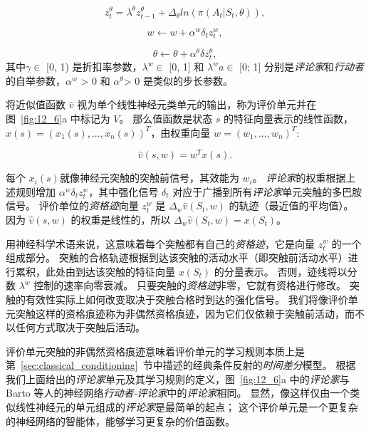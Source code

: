 \begin{equation}
	z_t^{\theta} = \lambda^{\theta} z_{t-1}^{\theta}
		+ \Delta_{\theta} ln(\pi(A_t | S_t, \theta)),
\end{equation}


\begin{equation}
	w \longleftarrow w + \alpha^w \delta_t z_t^w,
\end{equation}

\begin{equation}
	\theta \longleftarrow \theta + \alpha^{\theta} \delta z_t^{\theta},
\end{equation}
其中$\gamma \in $ [0, 1) 是折扣率参数，$\lambda^w \in$ [0, 1] 和 $\lambda ^w a \in$ [0; 1] 分别是\textit{评论家}和\textit{行动者}的自举参数，$\alpha ^w$ > 0 和 $\alpha ^{\theta}$> 0 是类似的步长参数。


将近似值函数 $\hat{v}$ 视为单个线性神经元类单元的输出，称为评价单元并在图~\ref{fig:12_6}a 中标记为 $V$。
那么值函数是状态 $s$ 的特征向量表示的线性函数，$x(s) = (x_1(s), ..., x_n(s))^T$，由权重向量 $w = (w_1, ..., w_n) ^T$:

\begin{equation} \label{eq:15_1}
	\hat{v}(s, w) = w^T x(s).
\end{equation}


每个 $x_i(s)$就像神经元突触的突触前信号，其效能为 $w_i$。
\textit{评论家}的权重根据上述规则增加 $\alpha^w \delta_t z_t^w$，其中强化信号 $\delta_t$ 对应于广播到所有\textit{评论家}单元突触的多巴胺信号。
评价单位的\textit{资格迹}向量 $z_t^w$ 是 $\Delta_w \hat{v} (S_t, w)$ 的轨迹（最近值的平均值）。
因为 $\hat{v}(s, w)$ 的权重是线性的，所以 $\Delta_w \hat{v} (S_t, w) = x(S_t)$。


用神经科学术语来说，这意味着每个突触都有自己的\textit{资格迹}，它是向量 $z_t^w$ 的一个组成部分。
突触的合格轨迹根据到达该突触的活动水平（即突触前活动水平）进行累积，此处由到达该突触的特征向量 $x(S_t)$ 的分量表示。
否则，迹线将以分数 $\lambda ^w$ 控制的速率向零衰减。
只要突触的\textit{资格迹}非零，它就有资格进行修改。
突触的有效性实际上如何改变取决于突触合格时到达的强化信号。
我们将像评价单元突触这样的资格痕迹称为非偶然资格痕迹，因为它们仅依赖于突触前活动，而不以任何方式取决于突触后活动。


评价单元突触的非偶然资格痕迹意味着评价单元的学习规则本质上是第~\ref{sec:classical_conditioning}~节中描述的经典条件反射的\textit{时间差分}模型。
根据我们上面给出的\textit{评论家}单元及其学习规则的定义，图~\ref{fig:12_6}a 中的\textit{评论家}与 Barto 等人的神经网络\textit{行动者-评论家}中的\textit{评论家}相同\cite{barto13neuron}。
显然，像这样仅由一个类似线性神经元的单元组成的\textit{评论家}是最简单的起点；
这个评价单元是一个更复杂的神经网络的智能体，能够学习更复杂的价值函数。


